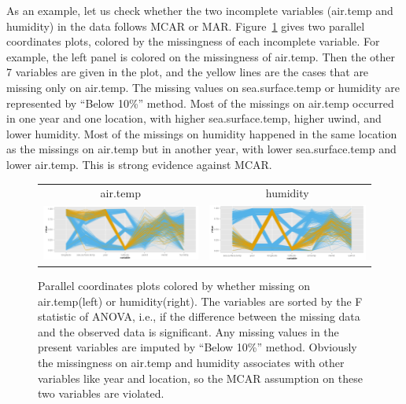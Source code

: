 \documentclass[article]{jss}
\begin{document}
As an example, let us check whether the two incomplete variables (air.temp and humidity) in the data  follows MCAR or MAR. Figure~\ref{fig:pcpCheck} gives two parallel coordinates plots, colored by the missingness of each incomplete variable. For example, the left panel is colored on the missingness of air.temp. Then the other 7 variables are given in the plot, and the yellow lines are the cases that are missing only on air.temp. The missing values on sea.surface.temp or humidity are represented by ``Below 10\%'' method. Most of the missings on air.temp occurred in one year and one location, with higher sea.surface.temp, higher uwind, and lower humidity. Most of the missings on humidity happened in the same location as the missings on air.temp but in another year, with lower sea.surface.temp and lower air.temp. This is strong evidence against MCAR.

\begin{center}
\begin{figure}[h]
\begin{centering}
\begin{tabular}{cc}
{\tiny{air.temp}} & {\tiny{humidity}}\tabularnewline
\includegraphics[width=.48\textwidth]{graph/fig12-2-air-temp-2} & 
\includegraphics[width=.48\textwidth]{graph/fig12-3-humidity-2} \tabularnewline
\end{tabular}
\par\end{centering}
\caption{Parallel coordinates plots colored by whether missing on air.temp(left) or humidity(right). The variables are sorted by the F statistic of ANOVA, i.e., if the difference between the missing data and the observed data is significant. Any missing values in the present variables are imputed by ``Below 10\%'' method. Obviously the missingness on air.temp and humidity associates with other variables like year and location, so the MCAR assumption on these two variables are violated.}
\label{fig:pcpCheck}
\end{figure}
\par\end{center}
\end{document}
